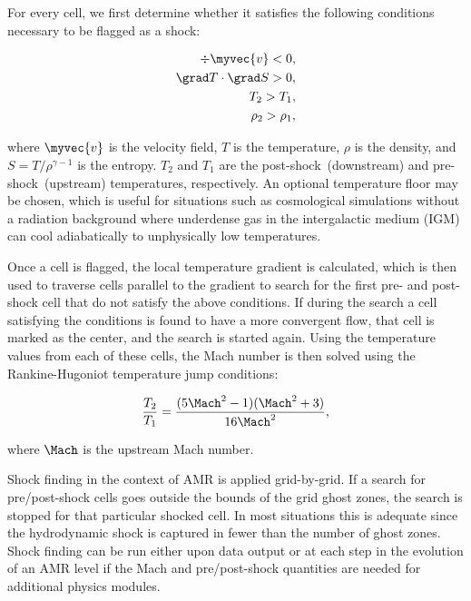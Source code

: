 For every cell, we first determine whether it satisfies the following
conditions necessary to be flagged as a shock:

\begin{eqnarray}
\div \myvec{v} < 0,\\
\grad T \cdot \grad S > 0,\\
T_2 > T_1,\\
\rho_2 > \rho_1,
\end{eqnarray}

where $\myvec{v}$ is the velocity field, $T$ is the temperature,
$\rho$ is the density, and $S=T/\rho^{\gamma-1}$ is the entropy.
$T_2$ and $T_1$ are the post-shock~(downstream) and
pre-shock~(upstream) temperatures, respectively. An optional
temperature floor may be chosen, which is useful for situations such
as cosmological simulations without a radiation background where
underdense gas in the intergalactic medium (IGM) can cool
adiabatically to unphysically low temperatures.

Once a cell is flagged, the local temperature gradient is calculated,
which is then used to traverse cells parallel to the gradient to
search for the first pre- and post-shock cell that do not satisfy the
above conditions.  If during the search a cell satisfying the
conditions is found to have a more convergent flow, that cell is
marked as the center, and the search is started again. Using the
temperature values from each of these cells, the Mach number is then
solved using the Rankine-Hugoniot temperature jump conditions:

\begin{equation}
\frac{T_2}{T_1} = \frac{(5\Mach^2 - 1)(\Mach^2 + 3)}{16\Mach^2},
\end{equation}

where $\Mach$ is the upstream Mach number.

Shock finding in the context of AMR is applied grid-by-grid.  If a
search for pre/post-shock cells goes outside the bounds of the grid
ghost zones, the search is stopped for that particular shocked
cell. In most situations this is adequate since the hydrodynamic shock
is captured in fewer than the number of ghost zones.  Shock finding
can be run either upon data output or at each step in the evolution of
an AMR level if the Mach and pre/post-shock quantities are needed for
additional physics modules.

